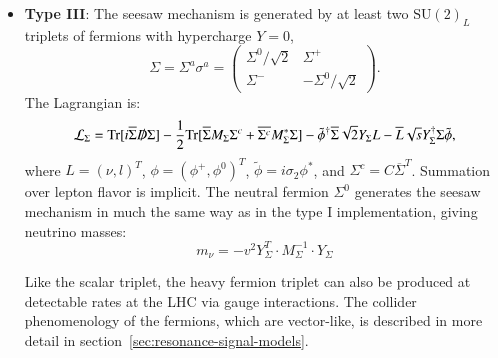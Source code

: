\begin{itemize}
	\item \textbf{Type III}: The seesaw mechanism is generated by at least two $\mathrm{SU}(2)_L$ triplets of fermions with hypercharge $Y=0$,
	\begin{equation}
		\Sigma = \Sigma^a \sigma^a = \left(\begin{array}{cc} \Sigma^0/\sqrt{2} & \Sigma^+ \\ \Sigma^- & -\Sigma^0/\sqrt{2} \end{array}\right). 
	\end{equation}
	The Lagrangian is:
	\begin{equation}
		\mathcal{L}_{\Sigma} = \mathrm{Tr}[i\overline{\Sigma}\slashed{D}\Sigma] - \frac12 \mathrm{Tr}[\overline{\Sigma}M_{\Sigma}\Sigma^c+\overline{\Sigma^c}M_{\Sigma}^{*}\Sigma] - \tilde{\phi}^{\dagger}\overline{\Sigma}\sqrt{2}Y_{\Sigma}L - \overline{L}\sqrt{s}Y_{\Sigma}^{\dagger}\Sigma \tilde{\phi},
	\end{equation}
	where $L=(\nu,l)^T$, $\phi=(\phi^+, \phi^0)^T$, $\tilde{\phi}=i\sigma_2\phi^{*}$, and $\Sigma^c=C\overline{\Sigma}^T$. Summation over lepton flavor is implicit. The neutral fermion $\Sigma^0$ generates the seesaw mechanism in much the same way as in the type I implementation, giving neutrino masses:
	\begin{equation}
		m_{\nu} = -v^2 Y_{\Sigma}^T \cdot M_{\Sigma}^{-1} \cdot Y_{\Sigma}
	\end{equation}
	
	Like the scalar triplet, the heavy fermion triplet can also be produced at detectable rates at the LHC via gauge interactions. The collider phenomenology of the fermions, which are vector-like, is described in more detail in section~\ref{sec:resonance-signal-models}. 
\end{itemize}

\printbibliography